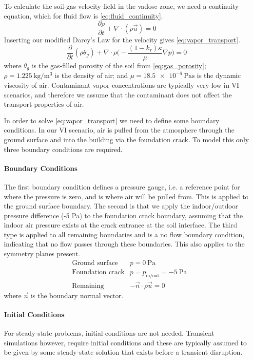 To calculate the soil-gas velocity field in the vadose zone, we need a continuity equation, which for fluid flow is \eqref{eq:fluid_continuity}.
\begin{equation}\label{eq:fluid_continuity}
  \frac{\partial \rho}{\partial t} + \nabla \cdot (\rho \vec{u}) = 0
\end{equation}
Inserting our modified Darcy's Law for the velocity gives \eqref{eq:vapor_transport}.
\begin{equation}\label{eq:vapor_transport}
  \frac{\partial}{\partial t} (\rho \theta_g) + \nabla \cdot \rho \Big( -\frac{(1-k_r) \kappa}{\mu} \nabla p \Big) = 0
\end{equation}
where $\theta_g$ is the gas-filled porosity of the soil from \eqref{eq:gas_porosity};
$\rho = \SI{1.225}{\kilogram\per\metre\cubed}$ is the density of air;
and $\mu = \SI{18.5e-6}{\pascal\second}$ is the dynamic viscosity of air.
Contaminant vapor concentrations are typically very low in VI scenarios, and therefore we assume that the contaminant does not affect the transport properties of air.\par

In order to solve \eqref{eq:vapor_transport} we need to define some boundary conditions.
In our VI scenario, air is pulled from the atmosphere through the ground surface and into the building via the foundation crack.
To model this only three boundary conditions are required.\par

\paragraph{Boundary Conditions}

The first boundary condition defines a pressure gauge, i.e. a reference point for where the pressure is zero, and is where air will be pulled from.
This is applied to the ground surface boundary.
The second is that we apply the indoor/outdoor pressure difference (-5 Pa) to the foundation crack boundary, assuming that the indoor air pressure exists at the crack entrance at the soil interface.
The third type is applied to all remaining boundaries and is a no flow boundary condition, indicating that no flow passes through these boundaries.
This also applies to the symmetry planes present.
\begin{align}
  &\text{Ground surface} &p = \SI{0}{\pascal} \\
  &\text{Foundation crack} &p = p_\mathrm{in/out} =\SI{-5}{\pascal} \\
  &\text{Remaining} &-\vec{n}\cdot\rho\vec{u} = 0
\end{align}
where $\vec{n}$ is the boundary normal vector.\par

\paragraph{Initial Conditions}

For steady-state problems, initial conditions are not needed.
Transient simulations however, require initial conditions and these are typically assumed to be given by some steady-state solution that exists before a transient disruption.\par
